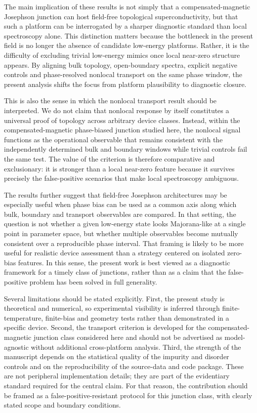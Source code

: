 \documentclass[11pt]{article}
\begin{document}
The main implication of these results is not simply that a compensated-magnetic Josephson junction can host field-free topological superconductivity, but that such a platform can be interrogated by a sharper diagnostic standard than local spectroscopy alone. This distinction matters because the bottleneck in the present field is no longer the absence of candidate low-energy platforms. Rather, it is the difficulty of excluding trivial low-energy mimics once local near-zero structure appears. By aligning bulk topology, open-boundary spectra, explicit negative controls and phase-resolved nonlocal transport on the same phase window, the present analysis shifts the focus from platform plausibility to diagnostic closure.

This is also the sense in which the nonlocal transport result should be interpreted. We do not claim that nonlocal response by itself constitutes a universal proof of topology across arbitrary device classes. Instead, within the compensated-magnetic phase-biased junction studied here, the nonlocal signal functions as the operational observable that remains consistent with the independently determined bulk and boundary windows while trivial controls fail the same test. The value of the criterion is therefore comparative and exclusionary: it is stronger than a local near-zero feature because it survives precisely the false-positive scenarios that make local spectroscopy ambiguous.

The results further suggest that field-free Josephson architectures may be especially useful when phase bias can be used as a common axis along which bulk, boundary and transport observables are compared. In that setting, the question is not whether a given low-energy state looks Majorana-like at a single point in parameter space, but whether multiple observables become mutually consistent over a reproducible phase interval. That framing is likely to be more useful for realistic device assessment than a strategy centered on isolated zero-bias features. In this sense, the present work is best viewed as a diagnostic framework for a timely class of junctions, rather than as a claim that the false-positive problem has been solved in full generality.

Several limitations should be stated explicitly. First, the present study is theoretical and numerical, so experimental visibility is inferred through finite-temperature, finite-bias and geometry tests rather than demonstrated in a specific device. Second, the transport criterion is developed for the compensated-magnetic junction class considered here and should not be advertised as model-agnostic without additional cross-platform analysis. Third, the strength of the manuscript depends on the statistical quality of the impurity and disorder controls and on the reproducibility of the source-data and code package. These are not peripheral implementation details; they are part of the evidentiary standard required for the central claim. For that reason, the contribution should be framed as a false-positive-resistant protocol for this junction class, with clearly stated scope and boundary conditions.
\end{document}
